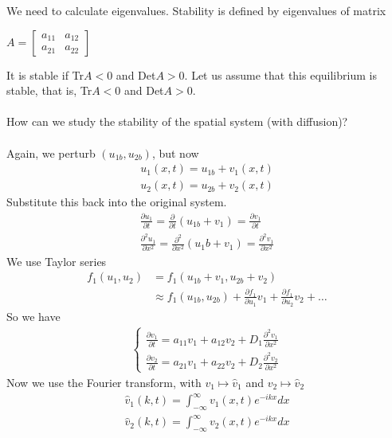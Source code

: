 \documentclass[12pt, letterpaper]{article}
\begin{document}
We need to calculate eigenvalues. Stability is defined by eigenvalues of matrix 
\begin{center}
    $A = \begin{bmatrix}
    a_{11} & a_{12} \\ a_{21} & a_{22}
    \end{bmatrix}$
\end{center}
It is stable if Tr$A < 0$ and Det$A > 0$. Let us assume that this equilibrium is stable, 
that is, Tr$A < 0$ and Det$A > 0$. \\ \\
How can we study the stability of the spatial system (with diffusion)? \\ \\
Again, we perturb $(u_{1b}, u_{2b})$, but now 
\begin{align*}
    u_1(x,t) = u_{1b} + v_1(x,t) \\
    u_2(x,t) = u_{2b} + v_2(x,t)
\end{align*}
Substitute this back into the original system.
\begin{align*}
    \frac{\partial u_1}{\partial t} = \frac{\partial}{\partial t}(u_{1b} + v_1) = \frac{\partial v_1}{\partial t} \\
    \frac{\partial^2 u_1}{\partial x^2} = \frac{\partial^2}{\partial x^2} (u_1b + v_1) = \frac{\partial^2 v_1}{\partial x^2}
\end{align*}
We use Taylor series
\begin{align*}
    f_1(u_1,u_2) &= f_1(u_{1b} + v_1, u_{2b} + v_2) \\
    &\approx f_1(u_{1b},u_{2b}) + \frac{\partial f_1}{\partial u_1} v_1 + \frac{\partial f_1}{\partial u_2} v_2 + \dots
\end{align*}
So we have 
\begin{align*}
    \begin{cases}
        \frac{\partial v_1}{\partial t} = a_{11} v_1 + a_{12}v_2 + D_1 \frac{\partial^2 v_1}{\partial x^2} \\
        \frac{\partial v_2}{\partial t} = a_{21} v_1 + a_{22}v_2 + D_2 \frac{\partial^2 v_2}{\partial x^2}
    \end{cases}
\end{align*}
Now we use the Fourier transform, with $v_1 \mapsto \hat v_1$ and $v_2 \mapsto \hat v_2$
\begin{align*}
    \hat v_1 (k,t) = \int_{-\infty}^{\infty} v_1 (x,t) e^{-ikx}dx \\
    \hat v_2 (k,t) = \int_{-\infty}^{\infty} v_2 (x,t) e^{-ikx}dx
\end{align*}
\end{document}

